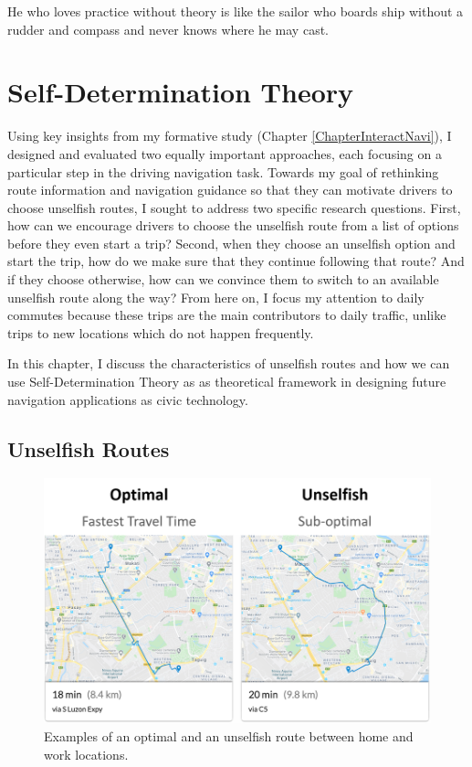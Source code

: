 \begin{savequote}[75mm]
He who loves practice without theory is like the sailor who boards ship without a rudder and compass and never knows where he may cast.
\end{savequote}

\chapter{Self-Determination Theory}
\label{ChapterSDT}
Using key insights from my formative study (Chapter \ref{ChapterInteractNavi}), I designed and evaluated two equally important approaches, each focusing on a particular step in the driving navigation task. Towards my goal of rethinking route information and navigation guidance so that they can motivate drivers to choose unselfish routes, I sought to address two specific research questions. First, how can we encourage drivers to choose the unselfish route from a list of options before they even start a trip? Second, when they choose an unselfish option and start the trip, how do we make sure that they continue following that route? And if they choose otherwise, how can we convince them to switch to an available unselfish route along the way? From here on, I focus my attention to daily commutes because these trips are the main contributors to daily traffic, unlike trips to new locations which do not happen frequently. 

In this chapter, I discuss the characteristics of unselfish routes and how we can use Self-Determination Theory as as theoretical framework in designing future navigation applications as civic technology. 

\section{Unselfish Routes}

\begin{figure}[t]
  \centering
  \includegraphics[scale=0.8]{figures/unselfish.png}
  \caption{Examples of an optimal and an unselfish route between home and work locations. }
  \label{fig:unselfish}
\end{figure}

